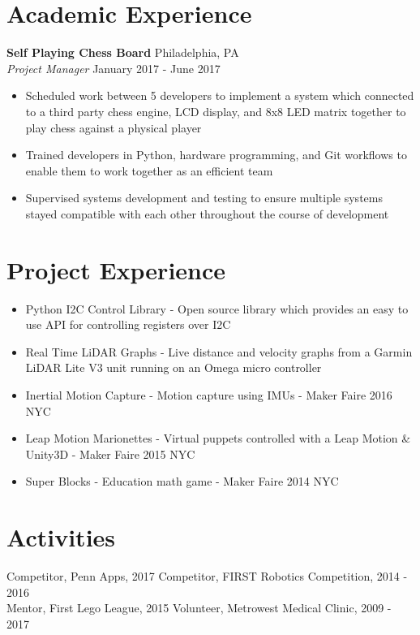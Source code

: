 \documentclass[10pt]{article}
\begin{document}
\begin{flushleft}
\section{Academic Experience}
	\textbf{Self Playing Chess Board} \hfill Philadelphia, PA \\
	\textit{Project Manager} \hfill January 2017 - June 2017 \\
	\begin{itemize}
		\item Scheduled work between 5 developers to implement a system
		      which connected to a third party chess engine, LCD 
		      display, and 8x8 LED matrix together to play chess 
		      against a  physical player
		\item Trained developers in Python, hardware programming, and 
		      Git workflows to enable them to work together as an 
		      efficient team 
		\item Supervised systems development and testing to ensure 
		      multiple systems stayed compatible with each other 
		      throughout the course of development
	\end{itemize}

\section{Project Experience}
	\begin{itemize}
		\item Python I2C Control Library - Open source library which 
		      provides an easy to use API for controlling registers
		      over I2C
		\item Real Time LiDAR Graphs - Live distance and velocity 
		      graphs from a Garmin LiDAR Lite V3 unit running on an Omega 
		      micro controller
		\item Inertial Motion Capture - Motion capture using IMUs - 
		      Maker Faire 2016 NYC
		\item Leap Motion Marionettes - Virtual puppets controlled with 
		      a Leap Motion \& Unity3D - Maker Faire 2015 NYC
		\item Super Blocks - Education math game - Maker Faire 2014 NYC
	\end{itemize}

\section{Activities}
	Competitor, Penn Apps, 2017 \hfill Competitor, FIRST Robotics Competition, 2014 - 2016 \\
	Mentor, First Lego League, 2015 \hfill Volunteer, Metrowest Medical Clinic, 2009 - 2017

\end{flushleft}
\end{document}
